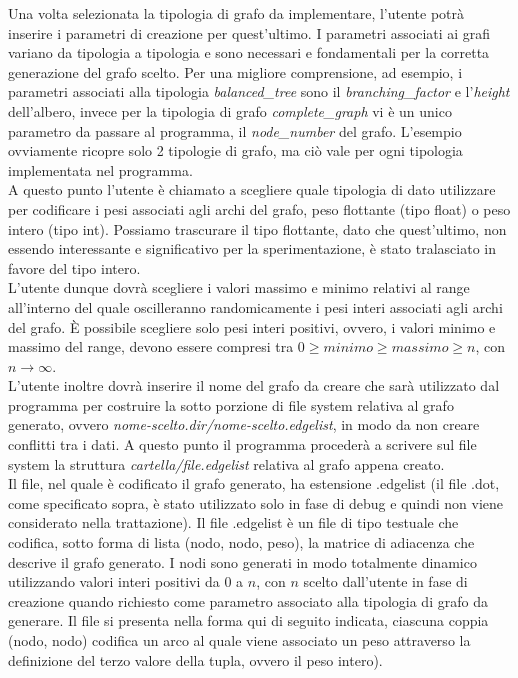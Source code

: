 Una volta selezionata la tipologia di grafo da implementare, l'utente potrà inserire i parametri di creazione per quest'ultimo. I parametri associati ai grafi variano da tipologia a tipologia e sono necessari e fondamentali per la corretta generazione del grafo scelto. Per una migliore comprensione, ad esempio, i parametri associati alla tipologia \textit{balanced\_tree} sono il \textit{branching\_factor} e l'\textit{height} dell'albero, invece per la tipologia di grafo \textit{complete\_graph} vi è un unico parametro da passare al programma, il \textit{node\_number} del grafo. L'esempio ovviamente ricopre solo 2 tipologie di grafo, ma ciò vale per ogni tipologia implementata nel programma.\\
A questo punto l'utente è chiamato a scegliere quale tipologia di dato utilizzare per codificare i pesi associati agli archi del grafo, peso flottante (tipo float) o peso intero (tipo int). Possiamo trascurare il tipo flottante, dato che quest'ultimo, non essendo interessante e significativo per la sperimentazione, è stato tralasciato in favore del tipo intero.\\
L'utente dunque dovrà scegliere i valori massimo e minimo relativi al range all'interno del quale oscilleranno randomicamente i pesi interi associati agli archi del grafo. È possibile scegliere solo pesi interi positivi, ovvero, i valori minimo e massimo del range, devono essere compresi tra \(0 \geq minimo \geq massimo \geq n\), con \(n\to\infty\).\\
L'utente inoltre dovrà inserire il nome del grafo da creare che sarà utilizzato dal programma per costruire la sotto porzione di file system relativa al grafo generato, ovvero \textit{nome-scelto.dir/nome-scelto.edgelist}, in modo da non creare conflitti tra i dati. A questo punto il programma procederà a scrivere sul file system la struttura \textit{cartella/file.edgelist} relativa al grafo appena creato.\\
Il file, nel quale è codificato il grafo generato, ha estensione .edgelist (il file .dot, come specificato sopra, è stato utilizzato solo in fase di debug e quindi non viene considerato nella trattazione). Il file .edgelist è un file di tipo testuale che codifica, sotto forma di lista (nodo, nodo, peso), la matrice di adiacenza che descrive il grafo generato. I nodi sono generati in modo totalmente dinamico utilizzando valori interi positivi da $0$ a $n$, con $n$ scelto dall'utente in fase di creazione quando richiesto come parametro associato alla tipologia di grafo da generare. Il file si presenta nella forma qui di seguito indicata, ciascuna coppia (nodo, nodo) codifica un arco al quale viene associato un peso attraverso la definizione del terzo valore della tupla, ovvero il peso intero).

